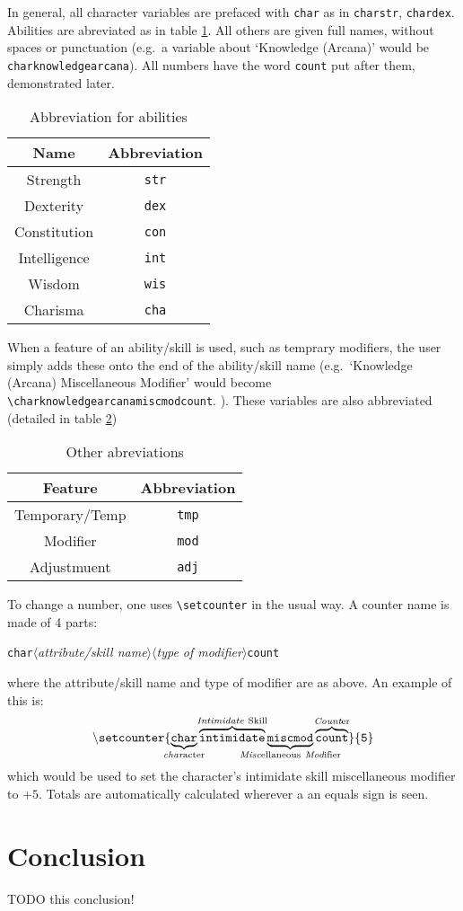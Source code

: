 \documentclass[oneside]{article}
\begin{document}
In general, all character variables are prefaced with \verb=char= as in \verb=charstr=, \verb=chardex=. Abilities are abreviated as in table \ref{tab:abbrev}. All others are given full names, without spaces or punctuation (e.g.\ a variable about `Knowledge (Arcana)' would be \verb=charknowledgearcana=). All numbers have the word \verb=count= put after them, demonstrated later.

\begin{table}[h]
  \centering
  \begin{tabular}{c c }
    Name & Abbreviation\\\hline
    Strength & \verb=str=\\
    Dexterity & \verb=dex=\\
    Constitution & \verb=con=\\
    Intelligence & \verb=int=\\
    Wisdom & \verb=wis=\\
    Charisma & \verb=cha=\\\hline
  \end{tabular}
  \caption{Abbreviation for abilities}
  \label{tab:abbrev}
\end{table}

When a feature of an ability/skill is used, such as temprary modifiers, the user simply adds these onto the end of the ability/skill name (e.g.\ `Knowledge (Arcana) Miscellaneous Modifier' would become \verb=\charknowledgearcanamiscmodcount=. ). These variables are also abbreviated (detailed in table \ref{tab:otherabbrev})

\begin{table}[h]
  \centering
  \begin{tabular}{c c }
    Feature & Abbreviation \\\hline
    Temporary/Temp & \verb=tmp=\\
    Modifier & \verb=mod=\\
    Adjustmuent & \verb=adj=\\\hline
  \end{tabular}
  \caption{Other abreviations}
  \label{tab:otherabbrev}
\end{table}

To change a number, one uses \verb=\setcounter= in the usual way. A counter name is made of 4 parts:
\protect\parbox{\linewidth}{\texttt{char}$\langle$\emph{attribute/skill name}$\rangle\langle$\emph{type of modifier}$\rangle$\texttt{count}}
where the attribute/skill name and type of modifier are as above. An example of this is:
\[
\mathtt{\backslash setcounter\{\underbrace{\mathtt{char}}_{\mathclap{\mathrm{\emph{char}acter}}}\overbrace{\mathtt{intimidate}}^{\mathclap{\mathrm{\emph{Intimidate}\ Skill}}}\underbrace{\mathtt{miscmod}}_{\mathclap{\mathrm{\emph{Misc}ellaneous\ \emph{Mod}ifier}}}\overbrace{\mathtt{count}}^{\mathclap{\mathrm{\emph{Count}er}}}\}\{5\}}
\]
which would be used to set the character's intimidate skill miscellaneous modifier to $+5$. Totals are automatically calculated wherever a an equals sign is seen.

\section{Conclusion}
\label{sec:conclusion}

TODO this conclusion!
\end{document}
